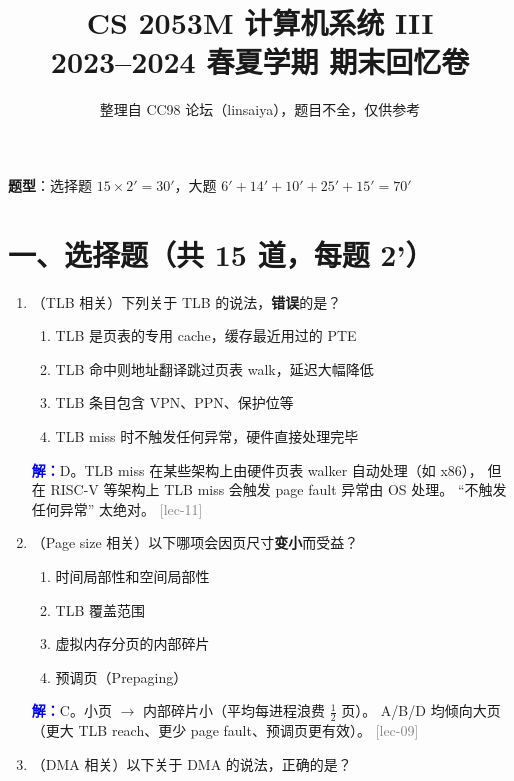 \documentclass[11pt,a4paper]{article}
\title{CS 2053M 计算机系统 III\\2023--2024 春夏学期 期末回忆卷}
\author{整理自 CC98 论坛（linsaiya），题目不全，仅供参考}
\date{}
\newcommand{\ans}{\par\noindent\textcolor{blue}{\textbf{解：}}}
\newcommand{\lec}[1]{\textcolor{gray}{[lec-#1]}}
\begin{document}
\maketitle

\vspace{-8pt}
\begin{center}
\textbf{题型}：选择题 $15\times 2' = 30'$，大题 $6'+14'+10'+25'+15' = 70'$
\end{center}

\section*{一、选择题（共 15 道，每题 2'）}

\begin{enumerate}[leftmargin=*,itemsep=8pt]

\item （TLB 相关）下列关于 TLB 的说法，\textbf{错误}的是？

  \begin{enumerate}[label=\Alph*.]
    \item TLB 是页表的专用 cache，缓存最近用过的 PTE
    \item TLB 命中则地址翻译跳过页表 walk，延迟大幅降低
    \item TLB 条目包含 VPN、PPN、保护位等
    \item TLB miss 时不触发任何异常，硬件直接处理完毕
  \end{enumerate}

  \ans D。TLB miss 在某些架构上由硬件页表 walker 自动处理（如 x86），
  但在 RISC-V 等架构上 TLB miss 会触发 page fault 异常由 OS 处理。
  ``不触发任何异常'' 太绝对。 \lec{11}

\item （Page size 相关）以下哪项会因页尺寸\textbf{变小}而受益？

  \begin{enumerate}[label=\Alph*.]
    \item 时间局部性和空间局部性
    \item TLB 覆盖范围
    \item 虚拟内存分页的内部碎片
    \item 预调页（Prepaging）
  \end{enumerate}

  \ans C。小页 $\to$ 内部碎片小（平均每进程浪费 $\tfrac12$ 页）。
  A/B/D 均倾向大页（更大 TLB reach、更少 page fault、预调页更有效）。 \lec{09}

\item （DMA 相关）以下关于 DMA 的说法，正确的是？


\end{enumerate}
\end{document}
